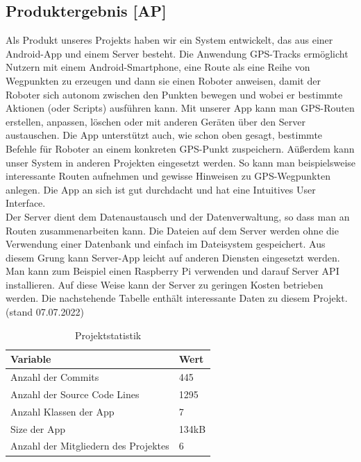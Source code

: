 \documentclass[10pt]{article}
\begin{document}
\subsection{Produktergebnis [AP]}
    Als Produkt unseres Projekts haben wir ein System entwickelt, das aus einer Android-App und einem Server besteht.
    Die Anwendung GPS-Tracks ermöglicht Nutzern mit einem Android-Smartphone, eine Route als eine Reihe von Wegpunkten zu erzeugen 
    und dann sie einen Roboter anweisen, damit der Roboter sich autonom zwischen den Punkten bewegen und wobei er bestimmte Aktionen (oder Scripts) ausführen kann. 
    Mit unserer App kann man GPS-Routen erstellen, anpassen, löschen oder mit anderen Geräten über den Server austauschen. Die App unterstützt auch, wie schon oben gesagt, bestimmte Befehle für Roboter
    an einem konkreten GPS-Punkt zuspeichern. Aüßerdem kann unser System in anderen Projekten eingesetzt werden. So kann man beispielsweise interessante Routen aufnehmen und gewisse Hinweisen zu GPS-Wegpunkten anlegen.
    Die App an sich ist gut durchdacht und hat eine Intuitives User Interface. \\ 
    Der Server dient dem Datenaustausch und der Datenverwaltung, so dass man an Routen zusammenarbeiten kann. Die Dateien auf dem Server werden ohne die Verwendung einer Datenbank
    und einfach im Dateisystem gespeichert. Aus diesem Grung kann Server-App leicht auf anderen Diensten eingesetzt werden. Man kann zum Beispiel einen Raspberry Pi verwenden und darauf
    Server API installieren. Auf diese Weise kann der Server zu geringen Kosten betrieben werden. 
    Die nachstehende Tabelle enthält interessante Daten zu diesem Projekt. (stand 07.07.2022)
    \begin{table}[H]
        \begin{tabular}{|l|l|}
        \hline
        \textbf{Variable} & \textbf{Wert}                                \\ \hline
        Anzahl der Commits  & 445 \\ \hline
        Anzahl der Source Code Lines  & 1295                 \\ \hline
        Anzahl Klassen der App    & 7                                 \\ \hline
        Size der App    & 134kB                                    \\ \hline
        Anzahl der Mitgliedern des Projektes   & 6                                      \\ \hline
        \end{tabular}
        \centering
        \caption{Projektstatistik}
    \end{table}
\end{document}
